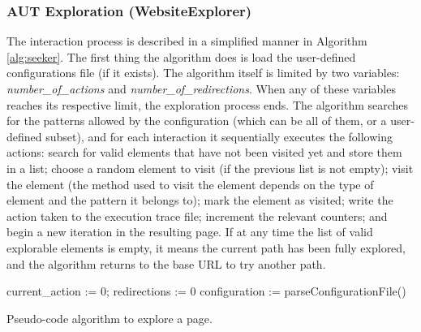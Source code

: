 \subsubsection{AUT Exploration (WebsiteExplorer)}\label{sec:inter}
The interaction process is described in a simplified manner in Algorithm \ref{alg:seeker}. The first thing the algorithm does is load the user-defined configurations file (if it exists). The algorithm itself is limited by two variables: \textit{number\_of\_actions} and \textit{number\_of\_redirections}. When any of these variables reaches its respective limit, the exploration process ends. The algorithm searches for the patterns allowed by the configuration (which can be all of them, or a user-defined subset), and for each interaction  it sequentially executes the following actions: search for valid elements that have not been visited yet and store them in a list; choose a random element to visit (if the previous list is not empty); visit the element (the method used to visit the element depends on the type of element and the pattern it belongs to); mark the element as visited; write the action taken to the execution trace file; increment the relevant counters; and begin a new iteration in the resulting page. If at any time the list of valid explorable elements is empty, it means the current path has been fully explored, and the algorithm returns to the base URL to try another path.

\begin{algorithm}
  
  current\_action := 0; redirections := 0\;
  configuration := parseConfigurationFile()\;
  

\caption{Pseudo-code algorithm to explore a page.}\label{alg:seeker}
\end{algorithm}

